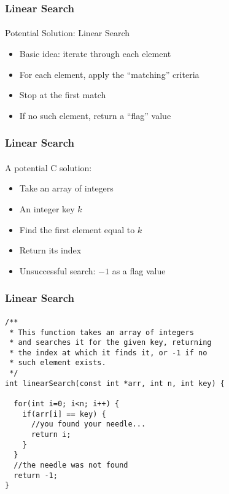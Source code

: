 \documentclass[]{beamer}
\begin{document}
\begin{frame}[fragile]
  \frametitle{Linear Search}
  \framesubtitle{}

Potential Solution: Linear Search
\begin{itemize}[<+->]
  \item Basic idea: iterate through each element
  \item For each element, apply the ``matching'' criteria
  \item Stop at the first match
  \item If no such element, return a ``flag'' value
\end{itemize}

\end{frame}

\begin{frame}[fragile]
  \frametitle{Linear Search}
  \framesubtitle{}

A potential C solution:
\begin{itemize}[<+->]
  \item Take an array of integers 
  \item An integer key $k$
  \item Find the first element equal to $k$
  \item Return its index
  \item Unsuccessful search: $-1$ as a flag value
\end{itemize}

\end{frame}

\begin{frame}[fragile]
  \frametitle{Linear Search}
  \framesubtitle{}

\begin{verbatim}
/**
 * This function takes an array of integers
 * and searches it for the given key, returning
 * the index at which it finds it, or -1 if no
 * such element exists.
 */
int linearSearch(const int *arr, int n, int key) {

  for(int i=0; i<n; i++) {
    if(arr[i] == key) {
      //you found your needle...
      return i;
    }
  }
  //the needle was not found
  return -1;
}
\end{verbatim}

\end{frame}
\end{document}
